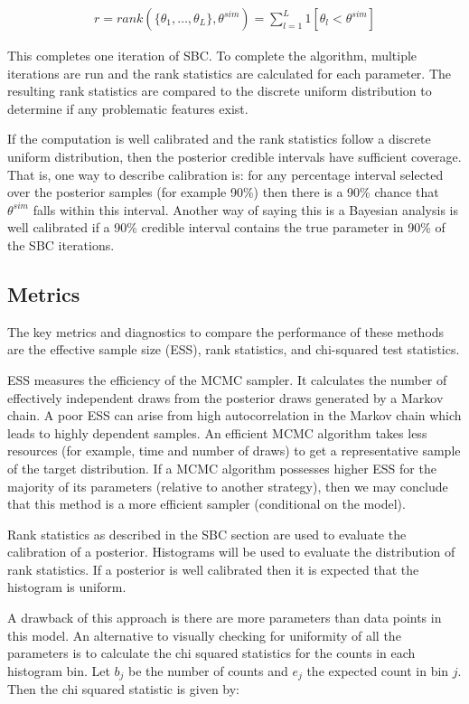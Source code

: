 \documentclass[12pt, a4paper]{article}
\begin{document}
        $$
        \begin{aligned}
        r = rank(\{\theta_1,\dots , \theta_{L}\}, \theta^{sim}) = \sum_{l=1}^{L}1[\theta_{l} < \theta^{sim}]
        \end{aligned}
        $$

        This completes one iteration of SBC. To complete the algorithm, multiple iterations are run and the rank statistics are calculated for each parameter. The resulting rank statistics are compared to the discrete uniform distribution to determine if any problematic features exist.

        If the computation is well calibrated and the rank statistics follow a discrete uniform distribution, then the posterior credible intervals have sufficient coverage. That is, one way to describe calibration is: for any percentage interval selected over the posterior samples (for example 90\%) then there is a 90\% chance that $\theta^{sim}$ falls within this interval. Another way of saying this is a Bayesian analysis is well calibrated if a 90\% credible interval contains the true parameter in 90\% of the SBC iterations. 

    \subsection{Metrics}
        The key metrics and diagnostics to compare the performance of these methods are the effective sample size (ESS), rank statistics, and chi-squared test statistics. 

        ESS measures the efficiency of the MCMC sampler. It calculates the number of effectively independent draws from the posterior draws generated by a Markov chain. A poor ESS can arise from high autocorrelation in the Markov chain which leads to highly dependent samples. An efficient MCMC algorithm takes less resources (for example, time and number of draws) to get a representative sample of the target distribution. If a MCMC algorithm possesses higher ESS for the majority of its parameters (relative to another strategy), then we may conclude that this method is a more efficient sampler (conditional on the model). 
    
        Rank statistics as described in the SBC section are used to evaluate the calibration of a posterior. Histograms will be used to evaluate the distribution of rank statistics. If a posterior is well calibrated then it is expected that the histogram is uniform.
    
        A drawback of this approach is there are more parameters than data points in this model. An alternative to visually checking for uniformity of all the parameters is to calculate the chi squared statistics for the counts in each histogram bin. Let $b_j$ be the number of counts and $e_j$ the expected count in bin $j$. Then the chi squared statistic is given by:
    
\end{document}
